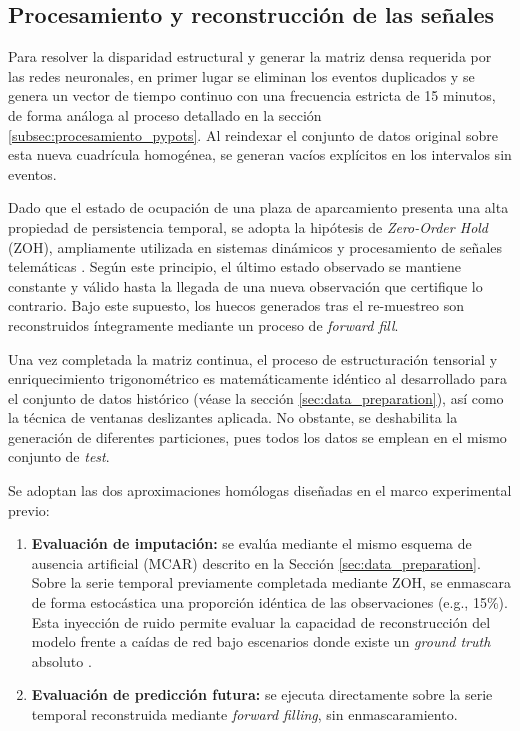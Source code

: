 \subsection{Procesamiento y reconstrucción de las señales}
\label{subsec:ffill_sota}

Para resolver la disparidad estructural y generar la matriz densa requerida por las redes neuronales, en primer lugar se eliminan los eventos duplicados y se genera un vector de tiempo continuo con una frecuencia estricta de 15 minutos, de forma análoga al proceso detallado en la sección \ref{subsec:procesamiento_pypots}. Al reindexar el conjunto de datos original sobre esta nueva cuadrícula homogénea, se generan vacíos explícitos en los intervalos sin eventos. 

Dado que el estado de ocupación de una plaza de aparcamiento presenta una alta propiedad de persistencia temporal, se adopta la hipótesis de \textit{Zero-Order Hold} (ZOH), ampliamente utilizada en sistemas dinámicos y procesamiento de señales telemáticas \cite{zero_order_hold_astrom}. Según este principio, el último estado observado se mantiene constante y válido hasta la llegada de una nueva observación que certifique lo contrario. Bajo este supuesto, los huecos generados tras el re-muestreo son reconstruidos íntegramente mediante un proceso de \textit{forward fill}.

Una vez completada la matriz continua, el proceso de estructuración tensorial y enriquecimiento trigonométrico es matemáticamente idéntico al desarrollado para el conjunto de datos histórico (véase la sección \ref{sec:data_preparation}), así como la técnica de ventanas deslizantes aplicada. No obstante, se deshabilita la generación de diferentes particiones, pues todos los datos se emplean en el mismo conjunto de \textit{test}. 

Se adoptan las dos aproximaciones homólogas diseñadas en el marco experimental previo:

\begin{enumerate}
	\item \textbf{Evaluación de imputación:} se evalúa mediante el mismo esquema de ausencia artificial (MCAR) descrito en la Sección \ref{sec:data_preparation}. Sobre la serie temporal previamente completada mediante ZOH, se enmascara de forma estocástica una proporción idéntica de las observaciones (e.g., 15\%). Esta inyección de ruido permite evaluar la capacidad de reconstrucción del modelo frente a caídas de red bajo escenarios donde existe un \textit{ground truth} absoluto \cite{du2023saits}.
	
	\item \textbf{Evaluación de predicción futura:} se ejecuta directamente sobre la serie temporal reconstruida mediante \textit{forward filling}, sin enmascaramiento.
\end{enumerate}




